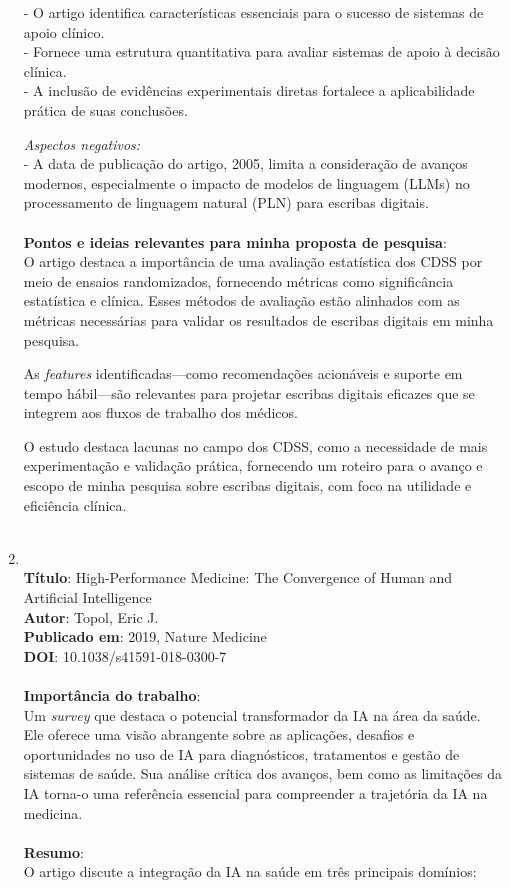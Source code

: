 \documentclass[
	article,
	11pt,
	oneside,
	a4paper,
	english,
	brazil,
	sumario=tradicional
	]{abntex2}
\begin{document}
\begin{enumerate}
- O artigo identifica características essenciais para o sucesso de sistemas de apoio clínico. \\
- Fornece uma estrutura quantitativa para avaliar sistemas de apoio à decisão clínica. \\
- A inclusão de evidências experimentais diretas fortalece a aplicabilidade prática de suas conclusões.

\textit{Aspectos negativos:}\\
- A data de publicação do artigo, 2005, limita a consideração de avanços modernos, especialmente o impacto de modelos de linguagem (LLMs) no processamento de linguagem natural (PLN) para escribas digitais.
\\ \\
\textbf{Pontos e ideias relevantes para minha proposta de pesquisa}:
\\
O artigo destaca a importância de uma avaliação estatística dos CDSS por meio de ensaios randomizados, fornecendo métricas como significância estatística e clínica. Esses métodos de avaliação estão alinhados com as métricas necessárias para validar os resultados de escribas digitais em minha pesquisa.

As \textit{features} identificadas—como recomendações acionáveis e suporte em tempo hábil—são relevantes para projetar escribas digitais eficazes que se integrem aos fluxos de trabalho dos médicos.

O estudo destaca lacunas no campo dos CDSS, como a necessidade de mais experimentação e validação prática, fornecendo um roteiro para o avanço e escopo de minha pesquisa sobre escribas digitais, com foco na utilidade e eficiência clínica.
\\ \\
\item \cite{topol2019high}
\\
\textbf{Título}: High-Performance Medicine: The Convergence of Human and Artificial Intelligence
\\
\textbf{Autor}: Topol, Eric J.
\\
\textbf{Publicado em}: 2019, Nature Medicine
\\
\textbf{DOI}: 10.1038/s41591-018-0300-7
\\
\\
\textbf{Importância do trabalho}:
\\
Um \textit{survey} que destaca o potencial transformador da IA na área da saúde. Ele oferece uma visão abrangente sobre as aplicações, desafios e oportunidades no uso de IA para diagnósticos, tratamentos e gestão de sistemas de saúde. Sua análise crítica dos avanços, bem como as limitações da IA torna-o uma referência essencial para compreender a trajetória da IA na medicina.
\\ \\
\textbf{Resumo}:
\\
O artigo discute a integração da IA na saúde em três principais domínios:


\end{enumerate}
\end{document}
